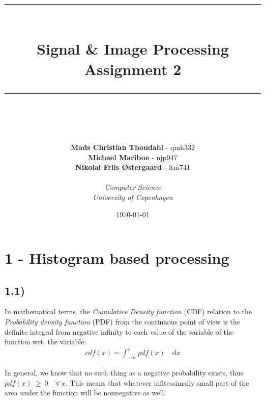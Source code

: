 \documentclass[a4paper]{article}
\newcommand{\HRule}{\rule{\linewidth}{0.5mm}}
\begin{document}
\begin{titlepage}
\title{\HRule \\[0.4cm]
\textbf{Signal \& Image Processing }\\Assignment 2\\
\HRule \\[0.4cm]}

\author{
\textbf{Mads Christian Thoudahl} - qmh332\\
\textbf{Michael Mariboe} - njp947\\
\textbf{Nikolai Friis Østergaard} - ltm741\\\\
\textit{Computer Science}\\
\textit{University of Copenhagen}
}

\date{\today}
\maketitle
\thispagestyle{empty}
\end{titlepage}

\newpage

\section*{1 - Histogram based processing}

\subsection*{1.1)}

In mathematical terms, the \textit{Cumulative Density function} (CDF) relation to the \textit{Probability density function} (PDF) from the continuous point of view is the definite integral from negative infinity to each value of the variable of the function wrt. the variable:
\begin{align}
  cdf(x) = \int_{-\infty}^x pdf(x) \quad \text{d}x
\end{align}

In general, we know that no such thing as a negative probability exists, thus $pdf(x) \: \geq \: 0 \quad \forall \: x$.
This means that whatever infitessimally small part of the area under the function will be nonnegative as well.
\end{document}

